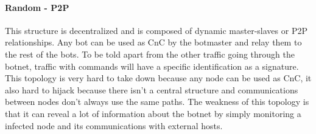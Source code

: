 \paragraph{Random - P2P}
This structure is decentralized and is composed of dynamic master-slaves or P2P relationships. Any bot can be used as CnC by the botmaster and relay them to the rest of the bots. To be told apart from the other traffic going through the botnet, traffic with commands will have a specific identification as a signature. This topology is very hard to take down because any node can be used as CnC, it also hard to hijack because there isn't a central structure and communications between nodes don't always use the same paths. The weakness of this topology is that it can reveal a lot of information about the botnet by simply monitoring a infected node and its communications with external hosts.

